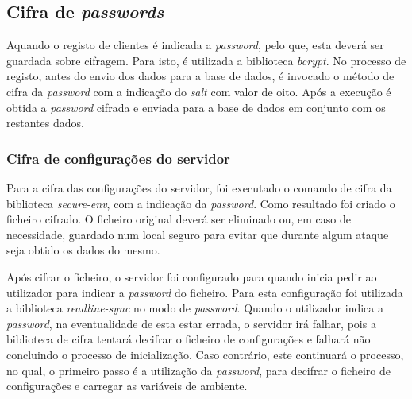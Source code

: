 \subsection{Cifra de \textit{passwords}}
Aquando o registo de clientes é indicada a \textit{password}, pelo que, esta deverá ser guardada sobre cifragem. Para isto, é utilizada a biblioteca \textit{bcrypt}. No processo de registo, antes do envio dos dados para a base de dados, é invocado o método de cifra da \textit{password} com a indicação do \textit{salt} com valor de oito. Após a execução é obtida a \textit{password} cifrada e enviada para a base de dados em conjunto com os restantes dados.

\subsubsection{Cifra de configurações do servidor}
Para a cifra das configurações do servidor, foi executado o comando de cifra da biblioteca \textit{secure-env}, com a indicação da \textit{password}. Como resultado foi criado o ficheiro cifrado. O ficheiro original deverá ser eliminado ou, em caso de necessidade, guardado num local seguro para evitar que durante algum ataque seja obtido os dados do mesmo.

Após cifrar o ficheiro, o servidor foi configurado para quando inicia pedir ao utilizador para indicar a \textit{password} do ficheiro. Para esta configuração foi utilizada a biblioteca \textit{readline-sync} no modo de \textit{password}. Quando o utilizador indica a \textit{password}, na eventualidade de esta estar errada, o servidor irá falhar, pois a biblioteca de cifra tentará decifrar o ficheiro de configurações e falhará não concluindo o processo de inicialização. Caso contrário, este continuará o processo, no qual, o primeiro passo é a utilização da \textit{password}, para decifrar o ficheiro de configurações e carregar as variáveis de ambiente.